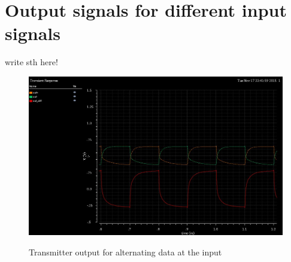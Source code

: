 \section{Output signals for different input signals}

 write sth here!

\begin{figure}[ht]
  \centering
  {\includegraphics[scale=0.6]{img/alternating_data.jpg}}
  \caption{Transmitter output for alternating data at the input}
  \label{fig:alternating_data}
\end{figure}

